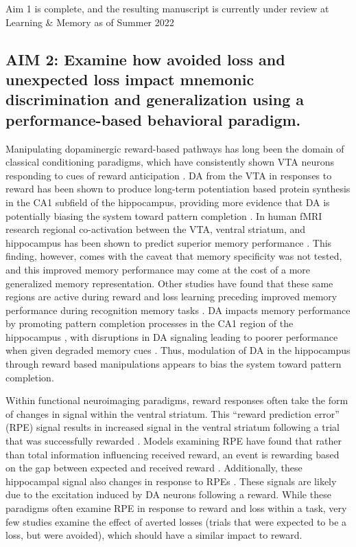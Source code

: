 \documentclass[11pt]{article}
\providecommand\citep{\cite}
\begin{document}
Aim 1 is complete, and the resulting manuscript is currently under review at Learning
\& Memory as of Summer 2022
\subsection*{AIM 2: Examine how avoided loss and unexpected loss impact mnemonic
    discrimination and generalization using a performance-based behavioral paradigm.}
Manipulating dopaminergic reward-based pathways has long been the domain of
classical conditioning paradigms, which have consistently shown VTA neurons responding
to cues of reward anticipation \citep{fiorillo_discrete_2003}. DA from the VTA in
responses to reward has been shown to produce long-term potentiation based protein
synthesis in the CA1 subfield of the hippocampus, providing more evidence that DA is
potentially biasing the system toward pattern completion \citep{huang_lateltp_1995}. In
human fMRI research regional co-activation between the VTA, ventral striatum, and
hippocampus has been shown to predict superior memory performance
\citep{adcock_reward-motivated_2006}. This finding, however, comes with the caveat that
memory specificity was not tested, and this improved memory performance may come at the
cost of a more generalized memory representation. Other studies have found that these
same regions are active during reward and loss learning preceding improved memory
performance during recognition memory tasks \citep{shigemune_remembering_2014}. DA
impacts memory performance by promoting pattern completion processes in the CA1 region
of the hippocampus \citep{kempadoo_dopamine_2016}, with disruptions in DA signaling
leading to poorer performance when given degraded memory cues \citep{li_balanced_2010}.
Thus, modulation of DA in the hippocampus through reward based manipulations appears to
bias the system toward pattern completion. \par

Within functional neuroimaging paradigms, reward responses often take the form of
changes in signal within the ventral striatum. This ``reward prediction error'' (RPE)
signal results in increased signal in the ventral striatum following a trial that was
successfully rewarded \citep{schultz_reward_1997,daw_rewardprediction_2011}. Models
examining RPE have found that rather than total information influencing received reward,
an event is rewarding based on the gap between expected and received reward
\citep{marvin_curiosity_2016}. Additionally, these hippocampal signal also changes in
response to RPEs \citep{davidow_upside_2016}. These signals are likely due to the
excitation induced by DA neurons following a reward. While these paradigms often examine
RPE in response to reward and loss within a task, very few studies examine the effect of
averted losses (trials that were expected to be a loss, but were avoided), which should
have a similar impact to reward. \par
\end{document}
